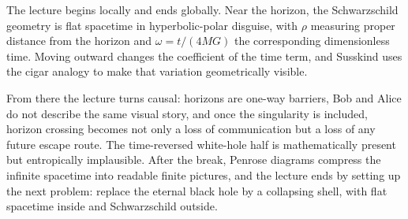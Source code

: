 The lecture begins locally and ends globally. Near the horizon, the Schwarzschild geometry is flat spacetime in hyperbolic-polar disguise, with \(\rho\) measuring proper distance from the horizon and \(\omega=t/(4MG)\) the corresponding dimensionless time. Moving outward changes the coefficient of the time term, and Susskind uses the cigar analogy to make that variation geometrically visible.

From there the lecture turns causal: horizons are one-way barriers, Bob and Alice do not describe the same visual story, and once the singularity is included, horizon crossing becomes not only a loss of communication but a loss of any future escape route. The time-reversed white-hole half is mathematically present but entropically implausible. After the break, Penrose diagrams compress the infinite spacetime into readable finite pictures, and the lecture ends by setting up the next problem: replace the eternal black hole by a collapsing shell, with flat spacetime inside and Schwarzschild outside.